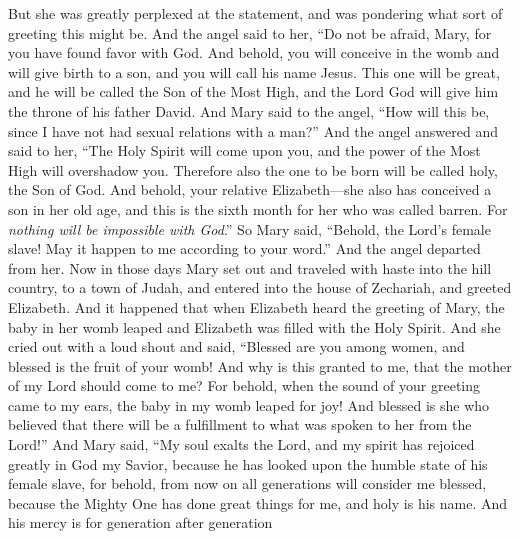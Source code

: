 \begin{biblechapter}
\verse But she was greatly perplexed at the statement, and was pondering what sort of greeting this might be.
\verse And the angel said to her,
\verse “Do not be afraid, Mary, for you have found favor with God.
\verse And behold, you will conceive in the womb and will give birth to a son, 
and you will call his name Jesus.
\verse This one will be great, and he will be called the Son of the Most High, 
and the Lord God will give him the throne of his father David.
\verse And Mary said to the angel, “How will this be, since I have not had sexual relations with a man?”
\verse And the angel answered and said to her, “The Holy Spirit will come upon you, 
and the power of the Most High will overshadow you. 
Therefore also the one to be born will be called holy, the Son of God.
\verse And behold, your relative Elizabeth—she also has conceived a son in her old age, and this is the sixth month for her who was called barren.
\verse For \textit{nothing will be impossible with God}.”
\verse So Mary said, “Behold, the Lord’s female slave! May it happen to me according to your word.” And the angel departed from her.
 Now in those days Mary set out and traveled with haste into the hill country, to a town of Judah,
\verse and entered into the house of Zechariah, and greeted Elizabeth.
\verse And it happened that when Elizabeth heard the greeting of Mary, the baby in her womb leaped and Elizabeth was filled with the Holy Spirit.
\verse And she cried out with a loud shout and said, “Blessed are you among women, 
and blessed is the fruit of your womb!
\verse And why is this granted to me, that the mother of my Lord should come to me?
\verse For behold, when the sound of your greeting came to my ears, the baby in my womb leaped for joy!
\verse And blessed is she who believed that there will be a fulfillment to what was spoken to her from the Lord!”
 And Mary said,
\verse “My soul exalts the Lord,
\verse and my spirit has rejoiced greatly in God my Savior,
\verse because he has looked upon the humble state of his female slave, 
for behold, from now on all generations will consider me blessed,
\verse because the Mighty One has done great things for me, 
and holy is his name.
\verse And his mercy is for generation after generation 

\end{biblechapter}
